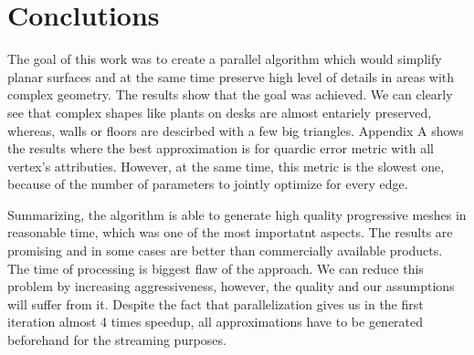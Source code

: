 \chapter{Conclutions}
\thispagestyle{empty}%

The goal of this work was to create a parallel algorithm which would simplify planar surfaces and at the same time preserve high level of details in areas with complex geometry. The results show that the goal was achieved. We can clearly see that complex shapes like plants on desks are almost entariely preserved, whereas, walls or floors are descirbed with a few big triangles. Appendix A shows the results where the best approximation is for quardic error metric with all vertex's attributies. However, at the same time, this metric is the slowest one, because of the number of parameters to jointly optimize for every edge.

Summarizing, the algorithm is able to generate high quality progressive meshes in reasonable time, which was one of the most importatnt aspects. The results are promising and in some cases are better than commercially available products. The time of processing is biggest flaw of the approach. We can reduce this problem by increasing aggressiveness, however, the quality and our assumptions will suffer from it. Despite the fact that parallelization gives us in the first iteration almost 4 times speedup, all approximations have to be generated beforehand for the streaming purposes.
